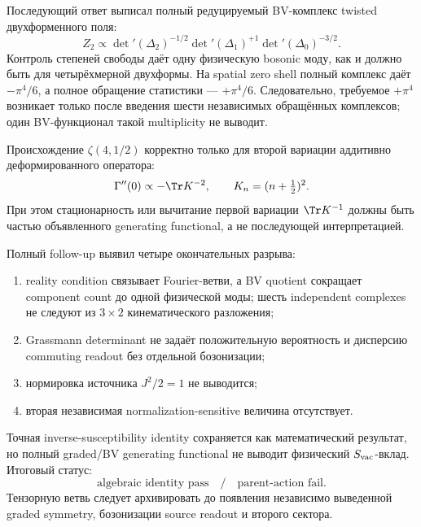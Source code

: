 Последующий ответ выписал полный редуцируемый BV-комплекс twisted
двухформенного поля:
\begin{equation}
 Z_2\propto
 \det{}'(\Delta_2)^{-1/2}
 \det{}'(\Delta_1)^{+1}
 \det{}'(\Delta_0)^{-3/2}.
\end{equation}
Контроль степеней свободы даёт одну физическую bosonic моду, как и должно
быть для четырёхмерной двухформы. На spatial zero shell полный комплекс
даёт \(-\pi^4/6\), а полное обращение статистики --- \(+\pi^4/6\).
Следовательно, требуемое \(+\pi^4\) возникает только после введения шести
независимых обращённых комплексов; один BV-функционал такой multiplicity не
выводит.

Происхождение \(\zeta(4,1/2)\) корректно только для второй вариации
аддитивно деформированного оператора:
\begin{equation}
 \Gamma''(0)\propto-\Tr K^{-2},
 \qquad
 K_n=(n+\tfrac12)^2.
\end{equation}
При этом стационарность или вычитание первой вариации
\(\Tr K^{-1}\) должны быть частью объявленного generating functional, а не
последующей интерпретацией.

Полный follow-up выявил четыре окончательных разрыва:
\begin{enumerate}
 \item reality condition связывает Fourier-ветви, а BV quotient сокращает
 component count до одной физической моды; шесть independent complexes не
 следуют из \(3\times2\) кинематического разложения;
 \item Grassmann determinant не задаёт положительную вероятность и
 дисперсию commuting readout без отдельной бозонизации;
 \item нормировка источника \(J^2/2=1\) не выводится;
 \item вторая независимая normalization-sensitive величина отсутствует.
\end{enumerate}

\begin{proposition}
Точная inverse-susceptibility identity сохраняется как математический
результат, но полный graded/BV generating functional не выводит физический
\(S_{\rm vac}\)-вклад. Итоговый статус:
\begin{equation}
 \text{algebraic identity pass}
 \quad/\quad
 \text{parent-action fail}.
\end{equation}
Тензорную ветвь следует архивировать до появления независимо выведенной
graded symmetry, бозонизации source readout и второго сектора.
\end{proposition}

